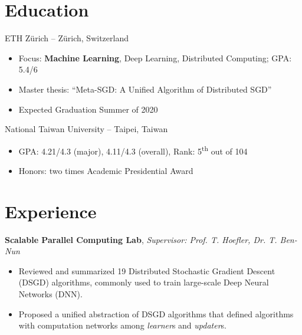 \documentclass[11pt,a4paper]{moderncv}
\begin{document}
\section{Education}
{ETH Z{\"u}rich -- Z\"urich, Switzerland
\begin{itemize}%
    \item Focus: \textbf{Machine Learning}, Deep Learning, Distributed Computing; GPA: 5.4/6
    \item Master thesis: ``Meta-SGD: A Unified Algorithm of Distributed SGD''
    \item Expected Graduation Summer of 2020
\end{itemize}
}
{National Taiwan University -- Taipei, Taiwan
    \begin{itemize}
        \item GPA: 4.21/4.3 (major), 4.11/4.3 (overall), Rank: 5\textsuperscript{th} out of 104
        \item Honors: two times Academic Presidential Award %
    \end{itemize}
}


\section{Experience}

{\textbf{Scalable Parallel Computing Lab}, \emph{Supervisor: Prof. T. Hoefler, Dr. T. Ben-Nun}
\begin{itemize}%
    \item Reviewed and summarized 19 Distributed Stochastic Gradient Descent (DSGD) algorithms, commonly used to train large-scale Deep Neural Networks (DNN).
    \item Proposed a unified abstraction of DSGD algorithms that defined algorithms with computation networks among \emph{learner}s and \emph{updater}s.
\end{itemize}
}
\end{document}
